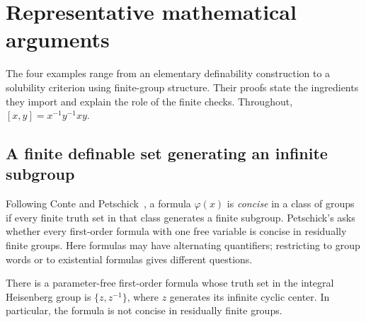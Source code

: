 \section{Representative mathematical arguments}
\label{sec:examples}

The four examples range from an elementary definability construction
to a solubility criterion using finite-group structure. Their proofs
state the ingredients they import and explain the role of the finite
checks. Throughout, $[x,y]=x^{-1}y^{-1}xy$.

\subsection{A finite definable set generating an infinite subgroup}
\label{subsec:concise}

Following Conte and Petschick~\cite{contepetschick}, a formula
$\varphi(x)$ is \emph{concise} in a class of groups if every finite
truth set in that class generates a finite subgroup.
Petschick's  asks whether every first-order formula with
one free variable is concise in residually finite groups.
Here formulas may have alternating quantifiers; restricting to
group words or to existential formulas gives different questions.

\begin{theorem}
\label{thm:concise}
There is a parameter-free first-order formula whose truth set in
the integral Heisenberg group is $\{z,z^{-1}\}$, where $z$ generates
its infinite cyclic center. In particular, the formula is not
concise in residually finite groups.
\end{theorem}

